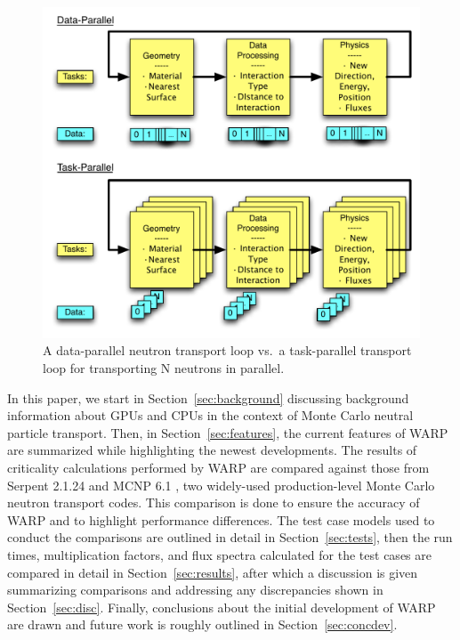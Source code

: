\documentclass[preprint,12pt]{elsarticle}
\begin{document}
\begin{figure}[h!] 
  \centering
    \includegraphics[width=\textwidth]{graphics/datavtask.pdf}
     \caption{A data-parallel neutron transport loop vs.\ a task-parallel transport loop for transporting N neutrons in parallel.  \label{datavtask} }
\end{figure}

In this paper, we start in Section~\ref{sec:background} discussing background information about GPUs and CPUs in the context of Monte Carlo neutral particle transport. Then, in Section~\ref{sec:features}, the current features of WARP are summarized while highlighting the newest developments.  The results of criticality calculations performed by WARP are compared against those from Serpent 2.1.24 \cite{jaakko,serpent} and MCNP 6.1 \cite{mcnp6}, two widely-used production-level Monte Carlo neutron transport codes.  This comparison is done to ensure the accuracy of WARP and to highlight performance differences.  The test case models used to conduct the comparisons are outlined in detail in Section~\ref{sec:tests}, then the run times, multiplication factors, and flux spectra calculated for the test cases are compared in detail in Section~\ref{sec:results}, after which a discussion is given summarizing comparisons and addressing any discrepancies shown in Section~\ref{sec:disc}.  Finally, conclusions about the initial development of WARP are drawn and future work is roughly outlined in Section~\ref{sec:concdev}. 
\end{document}
